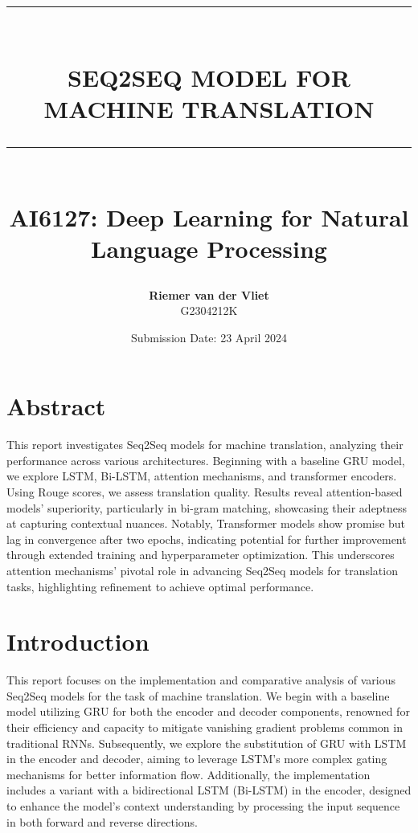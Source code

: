 \documentclass{article}
\newcommand{\HRule}[1]{\rule{\linewidth}{#1}}
\begin{document}
\title{ 
    \normalsize \textsc{} \\
    [2.0cm]
    \HRule{1.5pt} \\
    \LARGE \textbf{\uppercase{Seq2Seq Model for Machine Translation}} \\
    \HRule{2.0pt} \\ [0.6cm]
    \LARGE{AI6127: Deep Learning for Natural Language Processing} \\
    \vspace*{5\baselineskip}
}
\date{Submission Date: 23 April 2024}
\author{\textbf{Riemer van der Vliet} \\ 
    G2304212K}

\maketitle

\newpage

\section*{Abstract}
This report investigates Seq2Seq models for machine translation, analyzing their performance across various architectures. Beginning with a baseline GRU model, we explore LSTM, Bi-LSTM, attention mechanisms, and transformer encoders. Using Rouge scores, we assess translation quality. Results reveal attention-based models' superiority, particularly in bi-gram matching, showcasing their adeptness at capturing contextual nuances. Notably, Transformer models show promise but lag in convergence after two epochs, indicating potential for further improvement through extended training and hyperparameter optimization. This underscores attention mechanisms' pivotal role in advancing Seq2Seq models for translation tasks, highlighting refinement to achieve optimal performance.
\section{Introduction}
This report focuses on the implementation and comparative analysis of various Seq2Seq models for the task of machine translation. We begin with a baseline model utilizing GRU for both the encoder and decoder components, renowned for their efficiency and capacity to mitigate vanishing gradient problems common in traditional RNNs. Subsequently, we explore the substitution of GRU with LSTM in the encoder and decoder, aiming to leverage LSTM's more complex gating mechanisms for better information flow. Additionally, the implementation includes a variant with a bidirectional LSTM (Bi-LSTM) in the encoder, designed to enhance the model's context understanding by processing the input sequence in both forward and reverse directions.
\end{document}
